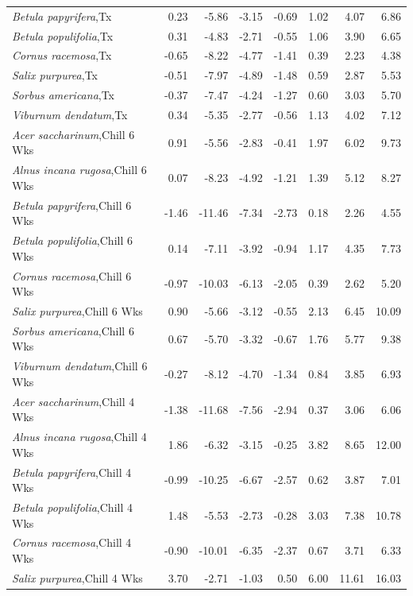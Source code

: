 \documentclass{article}\usepackage[]{graphicx}\usepackage[]{color}
\begin{document}
\begin{longtable}{lrrrrrrr}
  \textit{Betula papyrifera},Tx & 0.23 & -5.86 & -3.15 & -0.69 & 1.02 & 4.07 & 6.86 \\ 
  \textit{Betula populifolia},Tx & 0.31 & -4.83 & -2.71 & -0.55 & 1.06 & 3.90 & 6.65 \\ 
  \textit{Cornus racemosa},Tx & -0.65 & -8.22 & -4.77 & -1.41 & 0.39 & 2.23 & 4.38 \\ 
  \textit{Salix purpurea},Tx & -0.51 & -7.97 & -4.89 & -1.48 & 0.59 & 2.87 & 5.53 \\ 
  \textit{Sorbus americana},Tx & -0.37 & -7.47 & -4.24 & -1.27 & 0.60 & 3.03 & 5.70 \\ 
  \textit{Viburnum dendatum},Tx & 0.34 & -5.35 & -2.77 & -0.56 & 1.13 & 4.02 & 7.12 \\ 
  \textit{Acer saccharinum},Chill 6 Wks & 0.91 & -5.56 & -2.83 & -0.41 & 1.97 & 6.02 & 9.73 \\ 
  \textit{Alnus incana rugosa},Chill 6 Wks & 0.07 & -8.23 & -4.92 & -1.21 & 1.39 & 5.12 & 8.27 \\ 
  \textit{Betula papyrifera},Chill 6 Wks & -1.46 & -11.46 & -7.34 & -2.73 & 0.18 & 2.26 & 4.55 \\ 
  \textit{Betula populifolia},Chill 6 Wks & 0.14 & -7.11 & -3.92 & -0.94 & 1.17 & 4.35 & 7.73 \\ 
  \textit{Cornus racemosa},Chill 6 Wks & -0.97 & -10.03 & -6.13 & -2.05 & 0.39 & 2.62 & 5.20 \\ 
  \textit{Salix purpurea},Chill 6 Wks & 0.90 & -5.66 & -3.12 & -0.55 & 2.13 & 6.45 & 10.09 \\ 
  \textit{Sorbus americana},Chill 6 Wks & 0.67 & -5.70 & -3.32 & -0.67 & 1.76 & 5.77 & 9.38 \\ 
  \textit{Viburnum dendatum},Chill 6 Wks & -0.27 & -8.12 & -4.70 & -1.34 & 0.84 & 3.85 & 6.93 \\ 
  \textit{Acer saccharinum},Chill 4 Wks & -1.38 & -11.68 & -7.56 & -2.94 & 0.37 & 3.06 & 6.06 \\ 
  \textit{Alnus incana rugosa},Chill 4 Wks & 1.86 & -6.32 & -3.15 & -0.25 & 3.82 & 8.65 & 12.00 \\ 
  \textit{Betula papyrifera},Chill 4 Wks & -0.99 & -10.25 & -6.67 & -2.57 & 0.62 & 3.87 & 7.01 \\ 
  \textit{Betula populifolia},Chill 4 Wks & 1.48 & -5.53 & -2.73 & -0.28 & 3.03 & 7.38 & 10.78 \\ 
  \textit{Cornus racemosa},Chill 4 Wks & -0.90 & -10.01 & -6.35 & -2.37 & 0.67 & 3.71 & 6.33 \\ 
  \textit{Salix purpurea},Chill 4 Wks & 3.70 & -2.71 & -1.03 & 0.50 & 6.00 & 11.61 & 16.03 \\ 

\end{longtable}
\end{document}
